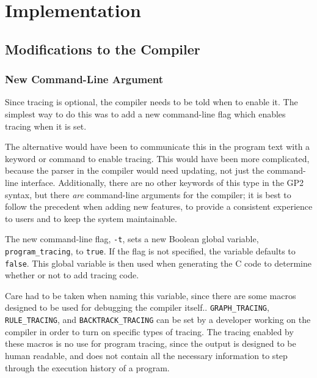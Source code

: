 \documentclass[authoryearcitations]{UoYCSproject}
\begin{document}
\chapter{Implementation}
\label{cha:Implementation}

\section{Modifications to the Compiler}
\label{sec:ModificationsToCompiler}

\subsection{New Command-Line Argument}
\label{sec:NewCommandLineArgument}

Since tracing is optional, the compiler needs to be told when to enable it. The
simplest way to do this was to add a new command-line flag which enables tracing
when it is set.

The alternative would have been to communicate this in the program text with a
keyword or command to enable tracing. This would have been more complicated,
because the parser in the compiler would need updating, not just the command-line
interface. Additionally, there are no other keywords of this type in the GP2
syntax, but there \emph{are} command-line arguments for the compiler; it is best
to follow the precedent when adding new features, to provide a consistent
experience to users and to keep the system maintainable.

The new command-line flag, \texttt{-t}, sets a new Boolean global variable,
\texttt{program\_tracing}, to \texttt{true}. If the flag is not specified, the
variable defaults to \texttt{false}. This global variable is then used when
generating the C code to determine whether or not to add tracing code.

Care had to be taken when naming this variable, since there are some macros
designed to be used for debugging the compiler itself.. \texttt{GRAPH\_TRACING},
\texttt{RULE\_TRACING}, and \texttt{BACKTRACK\_TRACING} can be set by a developer
working on the compiler in order to turn on specific types of tracing. The tracing
enabled by these macros is no use for program tracing, since the output is designed
to be human readable, and does not contain all the necessary information to step
through the execution history of a program.

\end{document}
